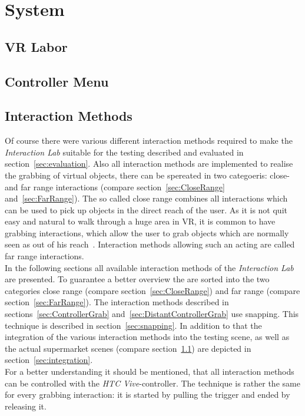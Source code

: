\section{System}\label{sec:System}

\subsection{VR Labor}\label{sec:VRLabor}

\subsection{Controller Menu} \label{sec:Menu}

\subsection{Interaction Methods}\label{sec:Interactions}
Of course there were various different interaction methods required to make the \textit{Interaction Lab} suitable for the testing described and evaluated in section~\ref{sec:evaluation}. Also all interaction methods are implemented to realise the grabbing of virtual objects, there can be spereated in two categoeris: close- and far range interactions (compare section~\ref{sec:CloseRange} and~\ref{sec:FarRange}). The so called close range combines all interactions which can be used to pick up objects in the direct reach of the user. As it is not quit easy and natural to walk through a huge area in VR, it is common to have grabbing interactions, which allow the user to grab objects which are normally seen as out of his reach~\cite{VRBook}. Interaction methods allowing such an acting are called far range interactions. \\
In the following sections all available interaction methods of the \textit{Interaction Lab} are presented. To guarantee a better overview the are sorted into the two categories close range (compare section~\ref{sec:CloseRange}) and far range (compare section~\ref{sec:FarRange}). The interaction methods described in sections~\ref{sec:ControllerGrab} and~\ref{sec:DistantControllerGrab} use snapping. This technique is described in section~\ref{sec:snapping}. In addition to that the integration of the various interaction methods into the testing scene, as well as the actual supermarket scenes (compare section~\ref{sec:VRLabor}) are depicted in section~\ref{sec:integration}. \\
For a better understanding it should be mentioned, that all interaction methods can be controlled with the \textit{HTC Vive}-controller. The technique is rather the same for every grabbing interaction: it is started by pulling the trigger and ended by releasing it.

